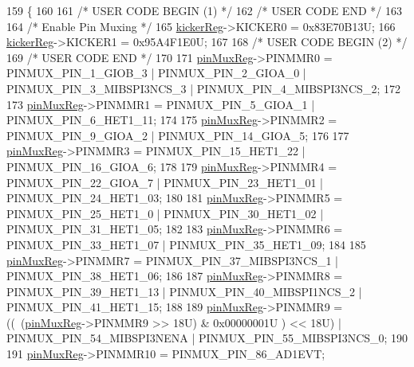 \begin{DoxyCode}
159                   \{
160 
161 \textcolor{comment}{/* USER CODE BEGIN (1) */}
162 \textcolor{comment}{/* USER CODE END */}
163 
164     \textcolor{comment}{/* Enable Pin Muxing */}
165     \mbox{\hyperlink{reg__pinmux_8h_a286f3b3064e923c24e41f9f680baf8ce}{kickerReg}}->KICKER0 = 0x83E70B13U;
166     \mbox{\hyperlink{reg__pinmux_8h_a286f3b3064e923c24e41f9f680baf8ce}{kickerReg}}->KICKER1 = 0x95A4F1E0U;
167     
168 \textcolor{comment}{/* USER CODE BEGIN (2) */}
169 \textcolor{comment}{/* USER CODE END */}
170 
171     \mbox{\hyperlink{reg__pinmux_8h_a489be2306394971fc7586946f88d6380}{pinMuxReg}}->PINMMR0 =    PINMUX\_PIN\_1\_GIOB\_3 | PINMUX\_PIN\_2\_GIOA\_0 | PINMUX\_PIN\_3\_MIBSPI3NCS\_3 
      | PINMUX\_PIN\_4\_MIBSPI3NCS\_2;
172     
173     \mbox{\hyperlink{reg__pinmux_8h_a489be2306394971fc7586946f88d6380}{pinMuxReg}}->PINMMR1 =    PINMUX\_PIN\_5\_GIOA\_1 | PINMUX\_PIN\_6\_HET1\_11;
174     
175     \mbox{\hyperlink{reg__pinmux_8h_a489be2306394971fc7586946f88d6380}{pinMuxReg}}->PINMMR2 =    PINMUX\_PIN\_9\_GIOA\_2 | PINMUX\_PIN\_14\_GIOA\_5;
176     
177     \mbox{\hyperlink{reg__pinmux_8h_a489be2306394971fc7586946f88d6380}{pinMuxReg}}->PINMMR3 =    PINMUX\_PIN\_15\_HET1\_22 | PINMUX\_PIN\_16\_GIOA\_6;
178     
179     \mbox{\hyperlink{reg__pinmux_8h_a489be2306394971fc7586946f88d6380}{pinMuxReg}}->PINMMR4 =    PINMUX\_PIN\_22\_GIOA\_7 | PINMUX\_PIN\_23\_HET1\_01 | PINMUX\_PIN\_24\_HET1\_03;
180     
181     \mbox{\hyperlink{reg__pinmux_8h_a489be2306394971fc7586946f88d6380}{pinMuxReg}}->PINMMR5 =    PINMUX\_PIN\_25\_HET1\_0 | PINMUX\_PIN\_30\_HET1\_02 | PINMUX\_PIN\_31\_HET1\_05;
182     
183     \mbox{\hyperlink{reg__pinmux_8h_a489be2306394971fc7586946f88d6380}{pinMuxReg}}->PINMMR6 =    PINMUX\_PIN\_33\_HET1\_07 | PINMUX\_PIN\_35\_HET1\_09;
184     
185     \mbox{\hyperlink{reg__pinmux_8h_a489be2306394971fc7586946f88d6380}{pinMuxReg}}->PINMMR7 =    PINMUX\_PIN\_37\_MIBSPI3NCS\_1 | PINMUX\_PIN\_38\_HET1\_06;
186     
187     \mbox{\hyperlink{reg__pinmux_8h_a489be2306394971fc7586946f88d6380}{pinMuxReg}}->PINMMR8 =    PINMUX\_PIN\_39\_HET1\_13 | PINMUX\_PIN\_40\_MIBSPI1NCS\_2 | 
      PINMUX\_PIN\_41\_HET1\_15;
188     
189     \mbox{\hyperlink{reg__pinmux_8h_a489be2306394971fc7586946f88d6380}{pinMuxReg}}->PINMMR9 = ((~(\mbox{\hyperlink{reg__pinmux_8h_a489be2306394971fc7586946f88d6380}{pinMuxReg}}->PINMMR9 >> 18U) & 0x00000001U ) << 18U) | 
      PINMUX\_PIN\_54\_MIBSPI3NENA | PINMUX\_PIN\_55\_MIBSPI3NCS\_0;
190     
191     \mbox{\hyperlink{reg__pinmux_8h_a489be2306394971fc7586946f88d6380}{pinMuxReg}}->PINMMR10 =   PINMUX\_PIN\_86\_AD1EVT;

\end{DoxyCode}
